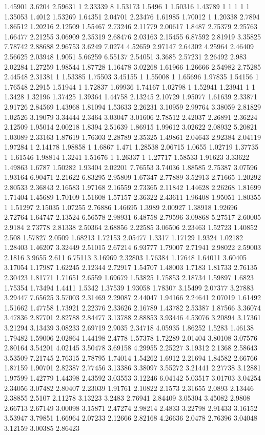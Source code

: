 1.45901 3.6204 2.59631 1 2.33339 8 1.53173 1.5496 1 1.50316 1.43789 1 1 1 1 1 1.35053 1.4012 1.53269 1.64351 2.04701 2.23476 1.61985 1.70012 1 1.20338 2.7894 1.86512 1.20216 2.12509 1.55467 2.73246 2.11779 2.00617 1.8487 2.75379 2.25763 1.66477 2.21255 3.06909 2.35319 2.68476 2.03163 2.15455 6.87592 2.81919 3.35825 7.78742 2.88688 2.96753 3.6249 7.0274 4.52659 2.97147 2.64302 4.25964 2.46409 2.56625 2.03948 1.9051 5.66259 6.55137 2.54051 3.3685 2.57231 2.26492 2.983 2.02284 1.27259 1.98544 1.87728 1.16478 3.02268 1.61966 1.26666 2.54982 2.75285 2.44548 2.31381 1 1.53385 1.75503 3.45155 1 1.55008 1 1.65696 1.97835 1.54156 1 1.76548 2.2915 1.51944 1 1.72837 1.69936 1.74167 1.02798 1 1.52941 1.23941 1 1 1.3428 1.32196 1.37425 1.39364 1.44758 2.13245 2.10729 1.95077 1.61639 2.33871 2.91726 2.84569 1.43968 1.81094 1.53633 2.26231 3.10959 2.99764 3.38059 2.81829 1.02526 3.19079 3.34444 2.3464 3.03047 3.01606 2.78512 2.42037 2.26891 2.36224 2.12509 1.95014 2.00218 1.8394 2.51639 1.86915 1.99612 3.02622 2.08932 5.20821 1.03089 2.33163 1.87619 1.76303 2.28789 2.35325 1.49861 2.04643 2.92384 2.04119 1.97284 1 2.14178 1.98858 1 1.6867 1.471 1.28538 2.06715 1.0655 1.02719 1.37735 1 1.61546 1.98814 1.3241 1.51676 1 1.26337 1 1.27717 1.58533 1.91623 3.33622 1.49863 1.6787 1.50282 1.93404 2.02201 7.76553 3.74036 1.88585 2.75387 3.07596 1.93164 6.90471 2.21622 6.83295 2.95809 1.67347 2.77889 3.52913 2.71665 1.20292 2.80533 2.36843 2.16583 1.97168 2.16559 2.73365 2.11842 1.44628 2.26268 1.81699 1.71404 1.45689 1.70109 1.51608 1.57157 2.36322 2.43611 1.96408 1.95051 1.80355 1 1.51297 2.15035 1.07255 2.76886 1.46695 1.3989 2.00927 1.38918 1.92696 2.72764 1.64747 2.13524 6.56578 2.98931 6.48758 2.79596 3.09868 5.27517 2.60005 2.9184 2.73778 2.81338 2.50364 2.68856 2.22585 3.06506 2.23463 1.52723 1.40852 2.508 1.57827 2.0509 1.68213 1.72153 2.05477 1.3317 1.17129 1.9324 1.02182 1.28403 1.46207 3.32449 2.51015 2.67214 6.93777 1.79007 2.71941 2.98022 2.59003 2.1816 3.9655 2.611 6.75113 3.16969 2.32803 1.76384 1.17648 1.64011 3.60405 3.17054 1.17987 1.62245 2.12344 2.72917 1.54707 1.48003 1.7183 1.81733 2.76135 2.30423 1.81771 1.71651 2.6559 1.69679 1.53825 1.75853 2.18734 1.59897 1.6823 1.75354 1.73494 1.4411 1.5342 1.37539 1.93058 1.78307 3.15499 2.07377 3.27883 3.29447 7.65625 3.57003 2.31469 2.29087 2.44047 1.94166 2.24641 2.07019 1.61492 1.51662 1.47758 1.73921 2.22376 2.33626 2.16789 1.43782 2.53387 1.87566 3.36074 3.47836 2.87701 2.82788 2.84477 3.13788 2.88853 3.93446 4.53076 3.20894 3.17361 3.21294 3.13439 3.08233 2.69719 2.9035 2.34718 4.05935 1.86252 1.5283 1.46138 1.79482 1.59006 2.02864 1.44198 2.4778 1.57378 1.72289 2.01404 3.80108 3.07576 2.80164 3.54201 4.02145 3.50478 3.69158 4.29955 2.25227 3.19312 2.1368 2.58643 3.53509 7.21745 2.76315 2.78795 1.74014 1.54262 1.6912 2.21694 1.84582 2.66766 1.87159 1.90701 2.82387 2.77456 3.13386 3.38097 3.55272 3.21441 2.27738 3.12881 1.97599 1.42779 1.44398 2.43592 3.03553 3.12246 6.04142 5.03517 3.01703 3.04254 2.34056 3.07482 2.80407 2.23039 1.91761 2.10822 2.1573 2.31655 2.0893 2.13446 2.38855 2.5107 2.11278 3.13223 3.2483 2.76941 2.84409 3.05304 3.45082 2.9808 2.66713 2.67149 3.00098 3.15871 2.47274 2.98214 2.4833 3.22798 2.91433 3.16152 3.53947 3.79851 1.66964 2.07233 2.12666 2.82168 4.26636 2.0478 2.76396 3.04048 3.12159 3.00385 2.86423 